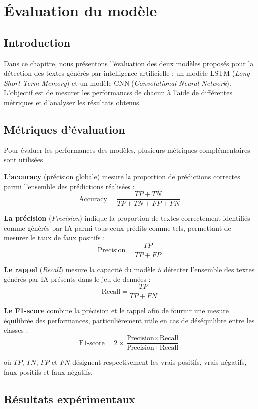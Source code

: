 \chapter{Évaluation du modèle}

\section{Introduction}
Dans ce chapitre, nous présentons l'évaluation des deux modèles proposés pour la détection
des textes générés par intelligence artificielle : un modèle LSTM (\textit{Long Short-Term Memory})
et un modèle CNN (\textit{Convolutional Neural Network}). L'objectif est de mesurer les performances
de chacun à l'aide de différentes métriques et d'analyser les résultats obtenus.

\section{Métriques d'évaluation}

Pour évaluer les performances des modèles, plusieurs métriques complémentaires sont utilisées.

\textbf{L'accuracy} (précision globale) mesure la proportion de prédictions correctes parmi
l'ensemble des prédictions réalisées :
\[
\text{Accuracy} = \frac{TP + TN}{TP + TN + FP + FN}
\]

\textbf{La précision} (\textit{Precision}) indique la proportion de textes correctement identifiés
comme générés par IA parmi tous ceux prédits comme tels, permettant de mesurer le taux de faux positifs :
\[
\text{Precision} = \frac{TP}{TP + FP}
\]

\textbf{Le rappel} (\textit{Recall}) mesure la capacité du modèle à détecter l'ensemble des textes
générés par IA présents dans le jeu de données :
\[
\text{Recall} = \frac{TP}{TP + FN}
\]

\textbf{Le F1-score} combine la précision et le rappel afin de fournir une mesure équilibrée des
performances, particulièrement utile en cas de déséquilibre entre les classes :
\[
\text{F1-score} = 2 \times \frac{\text{Precision} \times \text{Recall}}{\text{Precision} + \text{Recall}}
\]

où $TP$, $TN$, $FP$ et $FN$ désignent respectivement les vrais positifs, vrais négatifs,
faux positifs et faux négatifs.

\section{Résultats expérimentaux}

